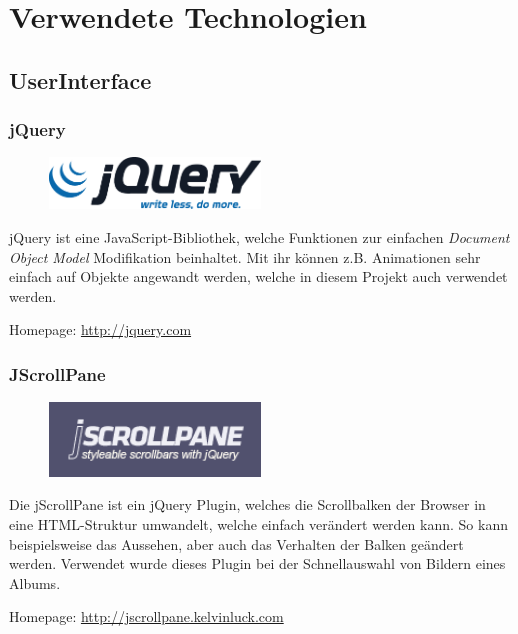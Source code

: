 \chapter{Verwendete Technologien}
\section{UserInterface}
\subsection{jQuery}
\begin{figure}[h]
  \centering
  \includegraphics[width=0.5\textwidth]{images/JQuery_logo.pdf}
\end{figure}
jQuery ist eine JavaScript-Bibliothek, welche Funktionen zur einfachen \textit{Document Object Model} Modifikation beinhaltet. Mit ihr können z.B. Animationen sehr einfach auf Objekte angewandt werden, welche in diesem Projekt auch verwendet werden.

Homepage: \url{http://jquery.com}

\subsection{JScrollPane}
\begin{figure}[h]
  \centering
  \includegraphics[width=0.5\textwidth]{images/jScrollPane_logo.png}
\end{figure}
Die jScrollPane ist ein jQuery Plugin, welches die Scrollbalken der Browser in eine HTML-Struktur umwandelt, welche einfach verändert werden kann. So kann beispielsweise das Aussehen, aber auch das Verhalten der Balken geändert werden. Verwendet wurde dieses Plugin bei der Schnellauswahl von Bildern eines Albums.

Homepage: \url{http://jscrollpane.kelvinluck.com}

